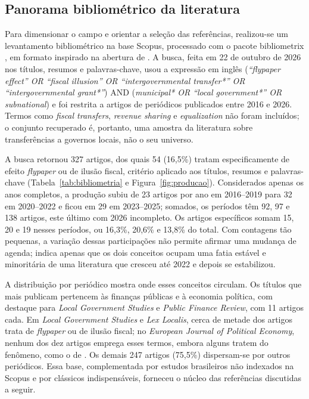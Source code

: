 \subsection{Panorama bibliométrico da literatura}\label{sec:bibliometria}

Para dimensionar o campo e orientar a seleção das referências, realizou-se um levantamento bibliométrico na base Scopus, processado com o pacote bibliometrix \citep{AriaCuccurullo2017}, em formato inspirado na abertura de \citet{Baker2022}. A busca, feita em 22 de outubro de 2026 nos títulos, resumos e palavras-chave, usou a expressão em inglês (\textit{``flypaper effect'' OR ``fiscal illusion'' OR ``intergovernmental transfer*'' OR ``intergovernmental grant*''}) AND (\textit{municipal* OR ``local government*'' OR subnational}) e foi restrita a artigos de periódicos publicados entre 2016 e 2026. Termos como \textit{fiscal transfers}, \textit{revenue sharing} e \textit{equalization} não foram incluídos; o conjunto recuperado é, portanto, uma amostra da literatura sobre transferências a governos locais, não o seu universo.

A busca retornou 327 artigos, dos quais 54 (16,5\%) tratam especificamente de efeito \textit{flypaper} ou de ilusão fiscal, critério aplicado aos títulos, resumos e palavras-chave (Tabela~\ref{tab:bibliometria} e Figura~\ref{fig:producao}). Considerados apenas os anos completos, a produção subiu de 23 artigos por ano em 2016--2019 para 32 em 2020--2022 e ficou em 29 em 2023--2025; somados, os períodos têm 92, 97 e 138 artigos, este último com 2026 incompleto. Os artigos específicos somam 15, 20 e 19 nesses períodos, ou 16,3\%, 20,6\% e 13,8\% do total. Com contagens tão pequenas, a variação dessas participações não permite afirmar uma mudança de agenda; indica apenas que os dois conceitos ocupam uma fatia estável e minoritária de uma literatura que cresceu até 2022 e depois se estabilizou.

A distribuição por periódico mostra onde esses conceitos circulam. Os títulos que mais publicam pertencem às finanças públicas e à economia política, com destaque para \textit{Local Government Studies} e \textit{Public Finance Review}, com 11 artigos cada. Em \textit{Local Government Studies} e \textit{Lex Localis}, cerca de metade dos artigos trata de \textit{flypaper} ou de ilusão fiscal; no \textit{European Journal of Political Economy}, nenhum dos dez artigos emprega esses termos, embora alguns tratem do fenômeno, como o de \citet{Shani2023}. Os demais 247 artigos (75,5\%) dispersam-se por outros periódicos. Essa base, complementada por estudos brasileiros não indexados na Scopus e por clássicos indispensáveis, forneceu o núcleo das referências discutidas a seguir.

